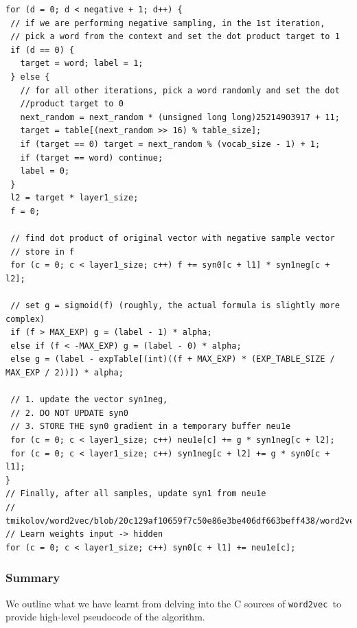 \documentclass[11pt]{book}
\newcommand{\wtov}{\texttt{word2vec }}
\begin{document}
\begin{verbatim}
for (d = 0; d < negative + 1; d++) {
 // if we are performing negative sampling, in the 1st iteration,
 // pick a word from the context and set the dot product target to 1
 if (d == 0) {
   target = word; label = 1;
 } else {
   // for all other iterations, pick a word randomly and set the dot
   //product target to 0
   next_random = next_random * (unsigned long long)25214903917 + 11;
   target = table[(next_random >> 16) % table_size];
   if (target == 0) target = next_random % (vocab_size - 1) + 1;
   if (target == word) continue;
   label = 0;
 }
 l2 = target * layer1_size;
 f = 0;

 // find dot product of original vector with negative sample vector
 // store in f
 for (c = 0; c < layer1_size; c++) f += syn0[c + l1] * syn1neg[c + l2];

 // set g = sigmoid(f) (roughly, the actual formula is slightly more complex)
 if (f > MAX_EXP) g = (label - 1) * alpha;
 else if (f < -MAX_EXP) g = (label - 0) * alpha;
 else g = (label - expTable[(int)((f + MAX_EXP) * (EXP_TABLE_SIZE / MAX_EXP / 2))]) * alpha;

 // 1. update the vector syn1neg,
 // 2. DO NOT UPDATE syn0
 // 3. STORE THE syn0 gradient in a temporary buffer neu1e
 for (c = 0; c < layer1_size; c++) neu1e[c] += g * syn1neg[c + l2];
 for (c = 0; c < layer1_size; c++) syn1neg[c + l2] += g * syn0[c + l1];
}
// Finally, after all samples, update syn1 from neu1e
// tmikolov/word2vec/blob/20c129af10659f7c50e86e3be406df663beff438/word2vec.c#L541
// Learn weights input -> hidden
for (c = 0; c < layer1_size; c++) syn0[c + l1] += neu1e[c];
\end{verbatim}



\subsubsection{Summary}

We outline what we have learnt from delving into the C sources
of \wtov to provide high-level pseudocode of the algorithm.
\end{document}
